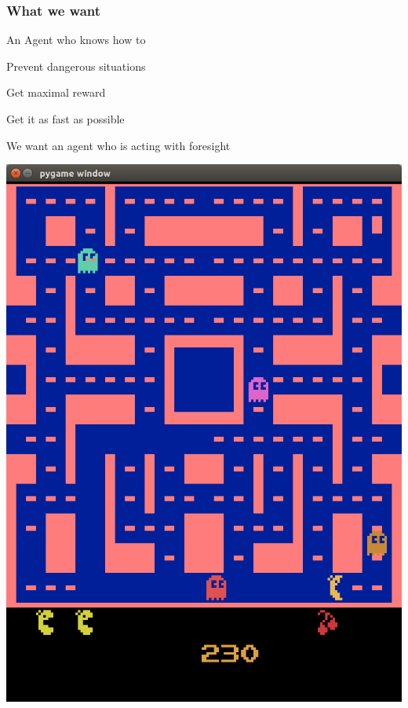 \begin{frame}
    \frametitle{What we want}

\begin{multicols}{2}
	An Agent who knows how to
	\begin{PraesentationAufzaehlung}
		\item Prevent dangerous situations
		\item Get maximal reward
		\item Get it as fast as possible
	\end{PraesentationAufzaehlung}
	We want an agent who is acting with foresight
    \vfill\columnbreak
	\begin{center}
    \includegraphics[height=.6\textheight]{./Images/screenshot_ghost.png}%
	\end{center}
\end{multicols}


\end{frame}
\clearpage



